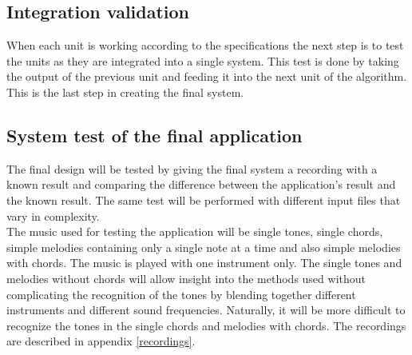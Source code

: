 \subsection{Integration validation}
When each unit is working according to the specifications the next step is to test the units as they are integrated into a single system. This test is done by taking the output of the previous unit and feeding it into the next unit of the algorithm. This is the last step in creating the final system.

\subsection{System test of the final application}
The final design will be tested by giving the final system a recording with a known result and comparing the difference between the application's result and the known result. The same test will be performed with different input files that vary in complexity.
\\
The music used for testing the application will be single tones, single chords, simple melodies containing only a single note at a time and also simple melodies with chords. The music is played with one instrument only. The single tones and melodies without chords will allow insight into the methods used without complicating the recognition of the tones by blending together different instruments and different sound frequencies. Naturally, it will be more difficult to recognize the tones in the single chords and melodies with chords. The recordings are described in appendix \ref{recordings}. 